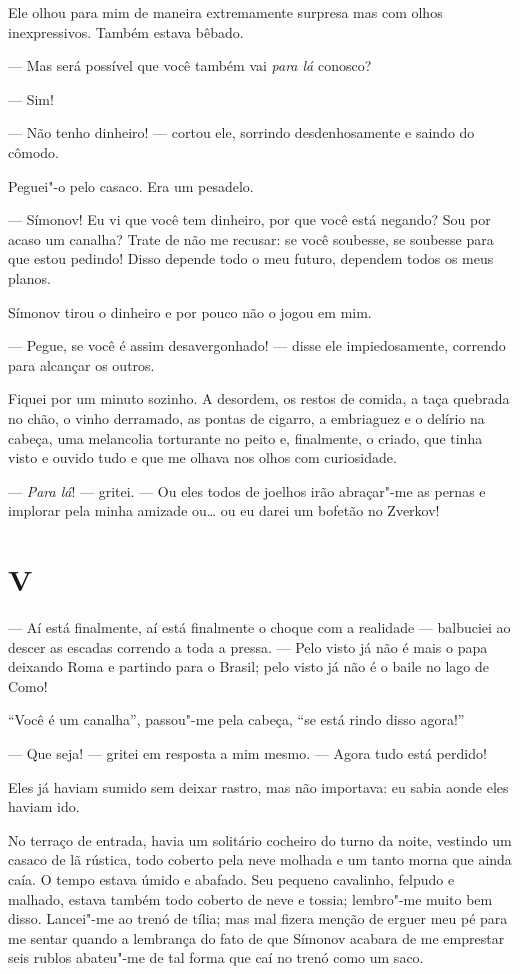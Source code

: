 Ele olhou para mim de maneira extremamente surpresa mas com olhos
inexpressivos. Também estava bêbado.

--- Mas será possível que você também vai \textit{para lá} conosco?

--- Sim!

--- Não tenho dinheiro! --- cortou ele, sorrindo desdenhosamente e saindo do
cômodo.

Peguei"-o pelo casaco. Era um pesadelo.

--- Símonov! Eu vi que você tem dinheiro, por que você está negando? Sou
por acaso um canalha? Trate de não me recusar: se você soubesse, se
soubesse para que estou pedindo! Disso depende todo o meu futuro,
dependem todos os meus planos.

Símonov tirou o dinheiro e por pouco não o jogou em mim.

--- Pegue, se você é assim desavergonhado! --- disse ele impiedosamente,
correndo para alcançar os outros.

Fiquei por um minuto sozinho. A desordem, os restos de comida, a taça
quebrada no chão, o vinho derramado, as pontas de cigarro, a embriaguez
e o delírio na cabeça, uma melancolia torturante no peito e,
finalmente, o criado, que tinha visto e ouvido tudo e que me olhava nos
olhos com curiosidade.

--- \textit{Para lá}! --- gritei. --- Ou eles todos de
joelhos irão abraçar"-me as pernas e implorar pela minha amizade ou\ldots{}
ou eu darei um bofetão no Zverkov!


\section{V}

--- Aí está finalmente, aí está finalmente o choque com a realidade ---
balbuciei ao descer as escadas correndo a toda a pressa. --- Pelo visto já
não é mais o papa deixando Roma e partindo para o Brasil; pelo visto já
não é o baile no lago de Como!

“Você é um canalha”, passou"-me pela cabeça, “se está rindo disso agora!”

--- Que seja! --- gritei em resposta a mim mesmo. --- Agora tudo está perdido!

Eles já haviam sumido sem deixar rastro, mas não importava: eu sabia
aonde eles haviam ido.

No terraço de entrada, havia um solitário cocheiro do turno da noite,
vestindo um casaco de lã rústica, todo coberto pela neve molhada e um
tanto morna que ainda caía. O tempo estava úmido e abafado. Seu pequeno
cavalinho, felpudo e malhado, estava também todo coberto de neve e
tossia; lembro"-me muito bem disso. Lancei"-me ao trenó de tília; mas mal
fizera menção de erguer meu pé para me sentar quando a lembrança do
fato de que Símonov acabara de me emprestar seis rublos abateu"-me de
tal forma que caí no trenó como um saco.

